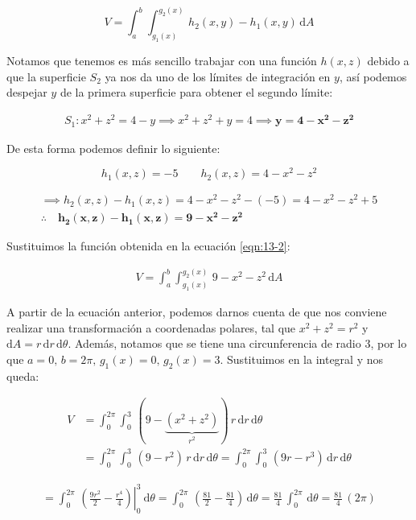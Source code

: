 \documentclass[12pt]{article}
\begin{document}
\begin{equation}\label{eqn:13-2}\tag{2}
	V = \int_{a}^{b}\int_{g_1(x)}^{g_2(x)}\, h_2(x,y)-h_1(x,y)\, \mathrm{d}A
\end{equation}

\noindent Notamos que tenemos es más sencillo trabajar con una función $h(x,z)$ debido a que la superficie $S_2$ ya nos da uno de los límites de integración en $y$, así podemos despejar $y$ de la primera superficie para obtener el segundo límite:

\begin{align*}
	S_1:x^2+z^2=4-y \implies x^2+z^2+y=4 \implies \boldsymbol{y=4-x^2-z^2}
\end{align*}

\noindent De esta forma podemos definir lo siguiente:

\begin{equation*}
	h_1(x,z) = -5 \qquad
	h_2(x,z) = 4-x^2-z^2
\end{equation*}

\begin{align*}
	\implies h_2(x,z) - h_1(x,z) = 4-x^2-z^2 - (-5) = 4-x^2-z^2 + 5\\
	\therefore \quad \boldsymbol{h_2(x,z) - h_1(x,z) = 9-x^2-z^2}
\end{align*}

\noindent Sustituimos la función obtenida en la ecuación \eqref{eqn:13-2}:

\begin{align*}
	V = \int_{a}^{b}\int_{g_1(x)}^{g_2(x)}\, 9-x^2-z^2\, \mathrm{d}A
\end{align*}

\noindent A partir de la ecuación anterior, podemos darnos cuenta de que nos conviene realizar una transformación a coordenadas polares, tal que $x^2+z^2 = r^2$ y $\mathrm{d}A = r\, \mathrm{d}r\,\mathrm{d}\theta
$. Además, notamos que se tiene una circunferencia de radio 3, por lo que $a=0,\, b=2\pi,\, g_1(x)=0,\, g_2(x)=3$. Sustituimos en la integral y nos queda:

\begin{align*}
	V &= \int_{0}^{2\pi}\int_{0}^{3}\, (9-\underbrace{(x^2+z^2)}_{\text{$r^2$}})\, r\, \mathrm{d}r\,\mathrm{d}\theta \\ &=  \int_{0}^{2\pi}\int_{0}^{3}\, (9-r^2)\, r\, \mathrm{d}r\,\mathrm{d}\theta = \int_{0}^{2\pi}\int_{0}^{3}\, (9r-r^3)\, \mathrm{d}r\,\mathrm{d}\theta
\end{align*}

\begin{align*}
	= \int_{0}^{2\pi}\, \left.\left(\frac{9r^2}{2}-\frac{r^4}{4}\right)\right|_0^3\ \mathrm{d}\theta = \int_{0}^{2\pi}\, \left(\frac{81}{2}-\frac{81}{4}\right)\,\mathrm{d}\theta = \frac{81}{4}\, \int_{0}^{2\pi}\, \mathrm{d}\theta = \frac{81}{4}\,(2\pi)
\end{align*}
\end{document}
